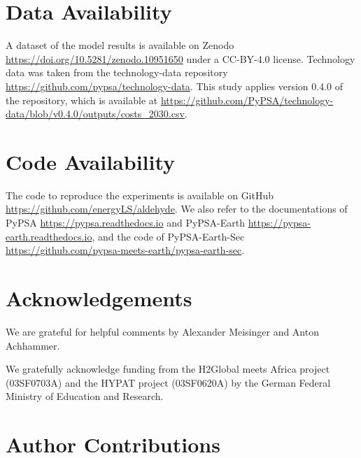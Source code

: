 \documentclass[5p,numafflabel]{elsarticle}
\begin{document}
\section*{Data Availability}
A dataset of the model results is available on Zenodo \href{https://doi.org/10.5281/zenodo.10951650}{https://doi.org/10.5281/zenodo.10951650} under a CC-BY-4.0 license. 
Technology data was taken from the technology-data repository \href{https://github.com/pypsa/technology-data}{https://github.com/pypsa/technology-data}. 
This study applies version 0.4.0 of the repository, which is available at \href{https://github.com/PyPSA/technology-data/blob/v0.4.0/outputs/costs_2030.csv}{https://github.com/PyPSA/technology-data/blob/v0.4.0/outputs/costs\_2030.csv}.

\section*{Code Availability}
The code to reproduce the experiments is available on GitHub \href{https://github.com/energyLS/aldehyde}{https://github.com/energyLS/aldehyde}.
We also refer to the documentations of PyPSA \href{https://pypsa.readthedocs.io}{https://pypsa.readthedocs.io} and PyPSA-Earth \href{https://pypsa-earth.readthedocs.io}{https://pypsa-earth.readthedocs.io}, and the code of PyPSA-Earth-Sec
\href{https://github.com/pypsa-meets-earth/pypsa-earth-sec}{https://github.com/pypsa-meets-earth/pypsa-earth-sec}.



\renewcommand{\ttdefault}{\sfdefault}



\section*{Acknowledgements}

We are grateful for helpful comments by Alexander Meisinger and Anton Achhammer.

We gratefully acknowledge funding from the H2Global meets Africa project (03SF0703A) and the HYPAT project (03SF0620A) by the German Federal Ministry of Education and Research.



\section*{Author Contributions}
\end{document}
